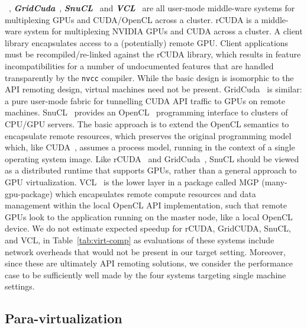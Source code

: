 ~\cite{rCUDA, rCUDAnew},
\textbf{\textit{GridCuda}}~\cite{GridCuda},
\textbf{\textit{SnuCL}}~\cite{kim2012snucl} and
\textbf{\textit{VCL}}~\cite{VCL} are all user-mode middle-ware systems for
multiplexing GPUs and CUDA/OpenCL across a cluster. rCUDA is a middle-ware
system for multiplexing NVIDIA GPUs and CUDA across a cluster. A client
library encapsulates access to a (potentially) remote GPU. Client applications
must be recompiled/re-linked against the rCUDA library, which results in
feature incompatibilities for a number of undocumented features that are
handled transparently by the {\tt nvcc} compiler. While the basic design is
isomorphic to the API remoting design, virtual machines need not be present.
GridCuda~\cite{GridCuda} is similar: a pure user-mode fabric for tunnelling
CUDA API traffic to GPUs on remote machines.
SnuCL~\cite{kim2012snucl} provides an OpenCL~\cite{openCLspec} programming
interface to clusters of CPU/GPU servers. The basic approach is to extend the
OpenCL semantics to encapsulate remote resources, which preserves the original
programming model which, like CUDA~\cite{CUDA:Programming-Guide}, assumes a
process model, running in the context of a single operating system image. Like
rCUDA~\cite{rCUDA} and GridCuda~\cite{GridCuda}, SnuCL should be viewed as a
distributed runtime that supports GPUs, rather than a general approach to GPU
virtualization.
VCL~\cite{VCL} is the lower layer in a package called MGP (many-gpu-package)
which encapsulates remote compute resources and data management within the
local OpenCL API implementation, such that remote GPUs look to the application
running on the master node, like a local OpenCL device.
We do not estimate expected speedup for rCUDA, GridCUDA, SnuCL, and VCL, in
Table~\ref{tab:virt-comp} as evaluations of these systems include network
overheads that would not be present in our target setting. Moreover, since
these are ultimately API remoting solutions, we consider the performance case
to be sufficiently well made by the four systems targeting single machine
settings.

\subsection{Para-virtualization}

